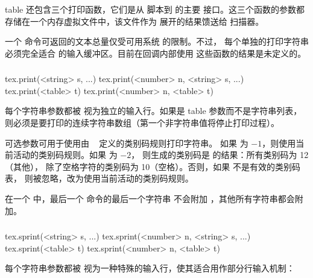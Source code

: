 
 table 还包含三个打印函数，它们是从 \LUA 脚本到 \TEX 的主要
接口。这三个函数的参数都存储在一个内存虚拟文件中，该文件作为 
展开的结果馈送给 \TEX 扫描器。

一个  命令可返回的文本总量仅受可用系统 \RAM 的限制。不过，
每个单独的打印字符串必须完全适合 \TEX 的输入缓冲区。目前在回调内部使用
这些函数的结果是未定义的。

\subsubsection{}


\begin{typing}
tex.print(<string> s, ...)
tex.print(<number> n, <string> s, ...)
tex.print(<table> t)
tex.print(<number> n, <table> t)
\end{typing}

每个字符串参数都被 \TEX 视为独立的输入行。如果是 table 参数而不是字符串列表，
则必须是要打印的连续字符串数组（第一个非字符串值将停止打印过程）。

可选参数可用于使用由 ~ 定义的类别码规则打印字符串。
如果  为 $-1$，则使用当前活动的类别码规则。如果  为 $-2$，
则生成的类别码是   的结果：所有类别码为 12（其他），
除了空格字符的类别码为 10（空格）。否则，如果  不是有效的类别码表，
则被忽略，改为使用当前活动的类别码规则。

在一个  中，最后一个  命令的最后一个字符串
不会附加 ，其他所有字符串都会附加。

\subsubsection{}


\begin{typing}
tex.sprint(<string> s, ...)
tex.sprint(<number> n, <string> s, ...)
tex.sprint(<table> t)
tex.sprint(<number> n, <table> t)
\end{typing}

每个字符串参数都被 \TEX 视为一种特殊的输入行，使其适合用作部分行输入机制：

